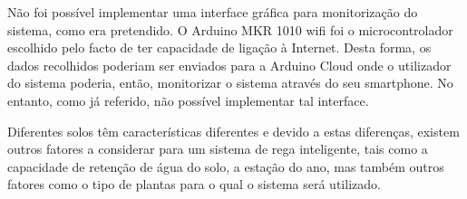 \documentclass[conference]{IEEEtran}
\begin{document}
Não foi possível implementar uma interface gráfica para monitorização do sistema, como era pretendido. 
O Arduino MKR 1010 wifi foi o microcontrolador escolhido pelo facto de ter capacidade de ligação à Internet. 
Desta forma, os dados recolhidos poderiam ser enviados para a Arduino Cloud onde o utilizador do sistema poderia, 
então, monitorizar o sistema através do seu smartphone. No entanto, como já referido, não possível 
implementar tal interface.

Diferentes solos têm características diferentes e devido a estas diferenças, existem outros 
fatores a considerar para um sistema de rega inteligente, tais como a capacidade de retenção de água do solo, 
a estação do ano, mas também outros fatores como o tipo de plantas para o qual o sistema será utilizado.



\end{document}
